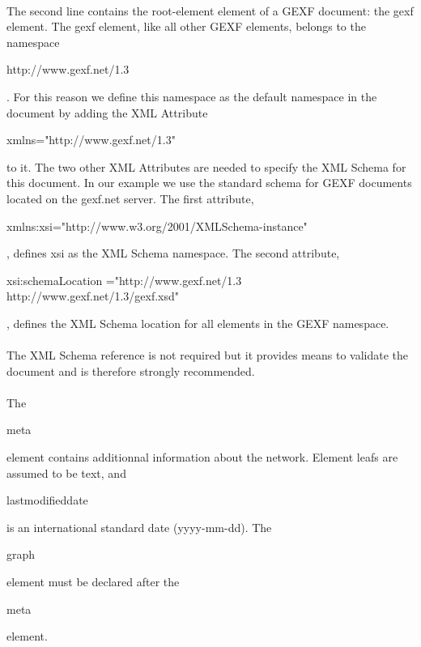 \documentclass[a4paper,10pt]{article}
\begin{document}
\paragraph{}
The second line contains the root-element element of a GEXF document: the gexf element. The gexf element, like all other GEXF elements, belongs to the namespace \begin{footnotesize}http://www.gexf.net/1.3\end{footnotesize}. For this reason we define this namespace as the default namespace in the document by adding the XML Attribute \begin{footnotesize}xmlns="http://www.gexf.net/1.3"\end{footnotesize} to it. The two other XML Attributes are needed to specify the XML Schema for this document. In our example we use the standard schema for GEXF documents located on the gexf.net server. The first attribute, \begin{footnotesize}xmlns:xsi="http://www.w3.org/2001/XMLSchema-instance"\end{footnotesize}, defines xsi as the XML Schema namespace. The second attribute, \begin{footnotesize}xsi:schemaLocation ="http://www.gexf.net/1.3 http://www.gexf.net/1.3/gexf.xsd"\end{footnotesize}, defines the XML Schema location for all elements in the GEXF namespace.

\paragraph{}
The XML Schema reference is not required but it provides means to validate the document and is therefore strongly recommended.

\paragraph{}
The \begin{footnotesize}meta\end{footnotesize} element contains additionnal information about the network. Element leafs are assumed to be text, and \begin{footnotesize}lastmodifieddate\end{footnotesize} is an international standard date (yyyy-mm-dd). The \begin{footnotesize}graph\end{footnotesize} element must be declared after the \begin{footnotesize}meta\end{footnotesize} element.
\end{document}
